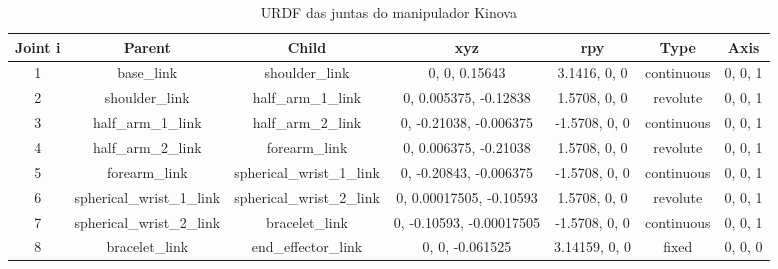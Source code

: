\documentclass[10pt]{article}
\begin{document}
\begin{table}[h!]
    \centering
    \begin{tabular}{|c|c|c|c|c|c|c|}
    \hline
    \textbf{Joint i} & \textbf{Parent} & \textbf{Child} & \textbf{xyz} & \textbf{rpy} & \textbf{Type} & \textbf{Axis} \\ \hline
    1 & base\_link & shoulder\_link & 0, 0, 0.15643 & 3.1416, 0, 0 & continuous & 0, 0, 1 \\ \hline
    2 & shoulder\_link & half\_arm\_1\_link & 0, 0.005375, -0.12838 & 1.5708, 0, 0 & revolute & 0, 0, 1 \\ \hline
    3 & half\_arm\_1\_link & half\_arm\_2\_link & 0, -0.21038, -0.006375 & -1.5708, 0, 0 & continuous & 0, 0, 1 \\ \hline
    4 & half\_arm\_2\_link & forearm\_link & 0, 0.006375, -0.21038 & 1.5708, 0, 0 & revolute & 0, 0, 1 \\ \hline
    5 & forearm\_link & spherical\_wrist\_1\_link & 0, -0.20843, -0.006375 & -1.5708, 0, 0 & continuous & 0, 0, 1 \\ \hline
    6 & spherical\_wrist\_1\_link & spherical\_wrist\_2\_link & 0, 0.00017505, -0.10593 & 1.5708, 0, 0 & revolute & 0, 0, 1 \\ \hline
    7 & spherical\_wrist\_2\_link & bracelet\_link & 0, -0.10593, -0.00017505 & -1.5708, 0, 0 & continuous & 0, 0, 1 \\ \hline
    8 & bracelet\_link & end\_effector\_link & 0, 0, -0.061525 & 3.14159, 0, 0 & fixed & 0, 0, 0 \\ \hline
    \end{tabular}
    \caption{URDF das juntas do manipulador Kinova}
    \label{tab:joints}
\end{table}
\end{document}
